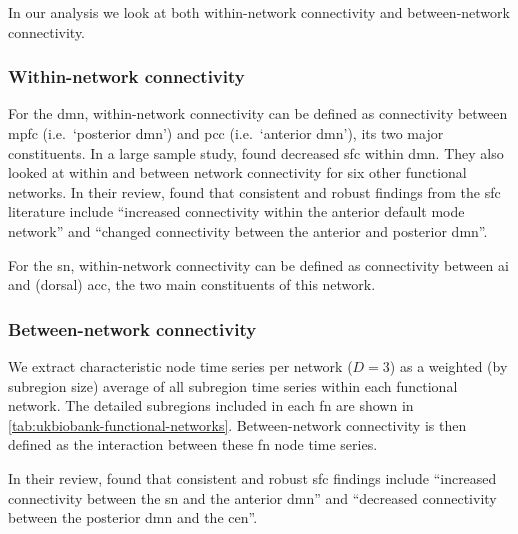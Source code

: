 In our analysis we look at both within-network connectivity and between-network connectivity.

\subsubsection{Within-network connectivity}

For the \gls{dmn}, within-network connectivity can be defined as connectivity between \gls{mpfc} (i.e.~`posterior \gls{dmn}') and \gls{pcc} (i.e.~`anterior \gls{dmn}'), its two major constituents.
In a large sample study, \textcite{Yan2019} found decreased \gls{sfc} within \gls{dmn}.
They also looked at within and between network connectivity for six other functional networks.
In their review, \textcite{Mulders2015} found that consistent and robust findings from the \gls{sfc} literature include ``increased connectivity within the anterior default mode network'' and ``changed connectivity between the anterior and posterior \gls{dmn}''.

For the \gls{sn}, within-network connectivity can be defined as connectivity between \gls{ai} and (dorsal) \gls{acc}, the two main constituents of this network.

\subsubsection{Between-network connectivity}

We extract characteristic node time series per network ($D = 3$) as a weighted (by subregion size) average of all subregion time series within each functional network.
The detailed subregions included in each \gls{fn} are shown in \cref{tab:ukbiobank-functional-networks}.
Between-network connectivity is then defined as the interaction between these \gls{fn} node time series.

In their review, \textcite{Mulders2015} found that consistent and robust \gls{sfc} findings include ``increased connectivity between the \gls{sn} and the anterior \gls{dmn}'' and ``decreased connectivity between the posterior \gls{dmn} and the \gls{cen}''.
